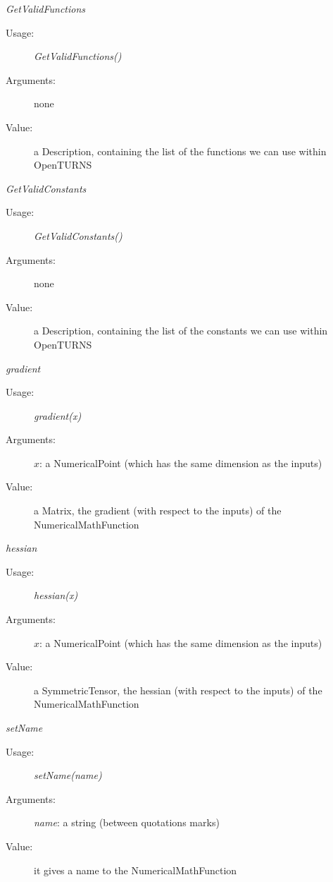 \begin{description}
\begin{description}
\item \textit{GetValidFunctions}
\begin{description}
\item[Usage:] \textit{GetValidFunctions()}
\item[Arguments:] none
\item[Value:] a Description, containing the list of the functions we can use within OpenTURNS
\end{description}
\bigskip


\item \textit{GetValidConstants}
\begin{description}
\item[Usage:] \textit{GetValidConstants()}
\item[Arguments:] none
\item[Value:] a Description, containing the list of the constants we can use within OpenTURNS
\end{description}
\bigskip


\item \textit{gradient}
\begin{description}
\item[Usage:] \textit{gradient(x)}
\item[Arguments:] $x$: a NumericalPoint (which has the same dimension as the inputs)
\item[Value:] a Matrix, the gradient (with respect to the inputs) of the
NumericalMathFunction
\end{description}
\bigskip

\item \textit{hessian}
\begin{description}
\item[Usage:] \textit{hessian(x)}
\item[Arguments:] $x$: a NumericalPoint (which has the same dimension as the inputs)
\item[Value:] a SymmetricTensor, the hessian (with respect to the inputs) of the
NumericalMathFunction
\end{description}
\bigskip

\item \textit{setName}
\begin{description}
\item[Usage:] \textit{setName(name)}
\item[Arguments:] \textit{name}: a string (between quotations marks)
\item[Value:] it gives a name to the NumericalMathFunction
\end{description}

\end{description}

\end{description}

